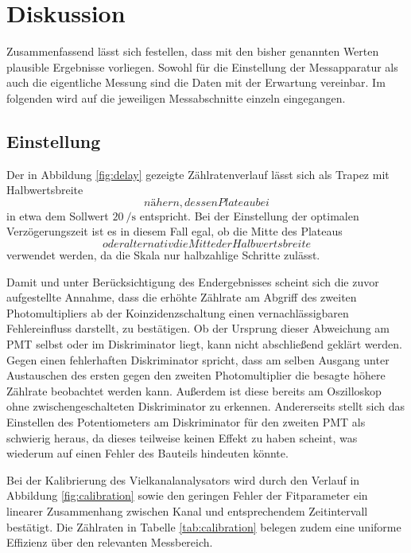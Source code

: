 \section{Diskussion}

Zusammenfassend lässt sich festellen, dass mit den bisher genannten Werten plausible Ergebnisse
vorliegen. Sowohl für die Einstellung der Messapparatur als auch die eigentliche Messung sind die
Daten mit der Erwartung vereinbar. Im folgenden wird auf die jeweiligen Messabschnitte einzeln
eingegangen.



\subsection{Einstellung}

Der in Abbildung \eqref{fig:delay} gezeigte Zählratenverlauf lässt sich als Trapez mit Halbwertsbreite
$$ nähern, dessen Plateau bei $$ in etwa dem Sollwert
$\qty{20}{\per\second}$ entspricht. Bei der Einstellung der optimalen Verzögerungszeit ist es in diesem
Fall egal, ob die Mitte des Plateaus $$ oder alternativ die Mitte der Halbwertsbreite
$$ verwendet werden, da die Skala nur halbzahlige Schritte zulässt.

Damit und unter Berücksichtigung des Endergebnisses scheint sich die zuvor aufgestellte Annahme, dass die
erhöhte Zählrate am Abgriff des zweiten Photomultipliers ab der Koinzidenzschaltung einen vernachlässigbaren
Fehlereinfluss darstellt, zu bestätigen. Ob der Ursprung dieser Abweichung am PMT
selbst oder im Diskriminator liegt, kann nicht abschließend geklärt werden. Gegen einen fehlerhaften
Diskriminator spricht, dass am selben Ausgang unter Austauschen des ersten gegen den zweiten
Photomultiplier die besagte höhere Zählrate beobachtet werden kann. Außerdem ist diese bereits
am Oszilloskop ohne zwischengeschalteten Diskriminator zu erkennen. Andererseits stellt sich das
Einstellen des Potentiometers am Diskriminator für den zweiten PMT als schwierig
heraus, da dieses teilweise keinen Effekt zu haben scheint, was wiederum auf einen Fehler des
Bauteils hindeuten könnte.

Bei der Kalibrierung des Vielkanalanalysators wird durch den Verlauf in Abbildung \eqref{fig:calibration}
sowie den geringen Fehler der Fitparameter ein linearer Zusammenhang zwischen Kanal und entsprechendem
Zeitintervall bestätigt. Die Zählraten in Tabelle \eqref{tab:calibration} belegen zudem eine uniforme Effizienz
über den relevanten Messbereich.




